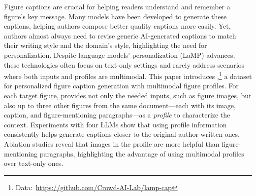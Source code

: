 Figure captions are crucial for helping readers understand and remember a figure's key message. 
Many models have been developed to generate these captions, helping authors compose better quality captions more easily.
Yet, authors almost always need to revise generic AI-generated captions to match their writing style and the domain's style, highlighting the need for personalization.
Despite language models' personalization (LaMP) advances, these technologies often focus on text-only settings and rarely address scenarios where both inputs and profiles are multimodal.
This paper introduces \textbf{\dataset},\footnote{Data:~\href{https://github.com/Crowd-AI-Lab/lamp-cap}{https://github.com/Crowd-AI-Lab/lamp-cap}} a dataset for personalized figure caption generation with multimodal figure profiles.
For each target figure, \dataset provides not only the needed inputs, such as figure images, but also up to three other figures from the same document---each with its image, caption, and figure-mentioning paragraphs---as a \textit{profile} to characterize the context.
Experiments with four LLMs show that using profile information consistently helps generate captions closer to the original author-written ones.
Ablation studies reveal that images in the profile are more helpful than figure-mentioning paragraphs, highlighting the advantage of using multimodal profiles over text-only ones.






















